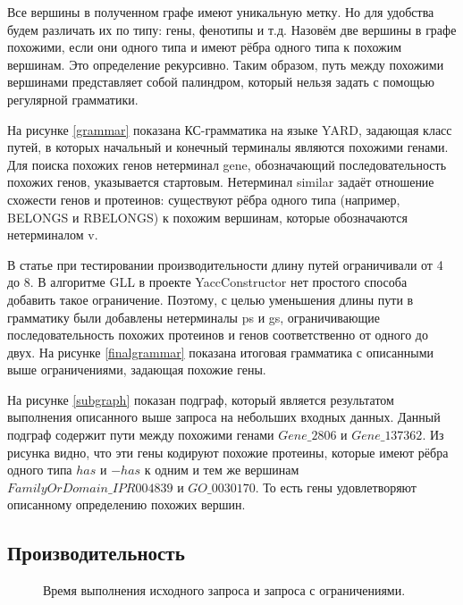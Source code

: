 \documentclass[14pt]{matmex-diploma}
\begin{document}
Все вершины в полученном графе имеют уникальную метку. Но для удобства будем различать их по типу: гены, фенотипы и т.д. Назовём две вершины в графе похожими, если они одного типа и имеют рёбра одного типа к похожим вершинам. Это определение рекурсивно. Таким образом, путь между похожими вершинами представляет собой палиндром, который нельзя задать с помощью регулярной грамматики. 

На рисунке \ref{grammar} показана КС-грамматика на языке YARD, задающая класс путей, в которых начальный и конечный терминалы являются похожими генами. Для поиска похожих генов нетерминал gene, обозначающий последовательность похожих генов, указывается стартовым. Нетерминал similar задаёт отношение схожести генов и протеинов: существуют рёбра одного типа (например, BELONGS и RBELONGS) к похожим вершинам, которые обозначаются нетерминалом v.

В статье \cite{subgraph} при тестировании производительности длину путей ограничивали от 4 до 8. В алгоритме GLL в проекте YaccConstructor нет простого способа добавить такое ограничение. Поэтому, с целью уменьшения длины пути в грамматику были добавлены нетерминалы ps и gs, ограничивающие последовательность похожих протеинов и генов соответственно от одного до двух. На рисунке \ref{finalgrammar} показана итоговая грамматика с описанными выше ограничениями, задающая похожие гены.

На рисунке \ref{subgraph} показан подграф, который является результатом выполнения описанного выше запроса на небольших входных данных. Данный подграф содержит пути между похожими генами $Gene\_2806$ и $Gene\_137362$. Из рисунка видно, что эти гены кодируют похожие протеины, которые имеют рёбра одного типа $has$ и $-has$ к одним и тем же вершинам $FamilyOrDomain\_IPR004839$ и $GO\_0030170$. То есть гены удовлетворяют описанному определению похожих вершин.

\subsection{Производительность}

\begin{figure}
\begin{center}
\end{center}
\caption{Время выполнения исходного запроса и запроса с ограничениями.}
\label{compareGrammar}
\end{figure}
\end{document}
